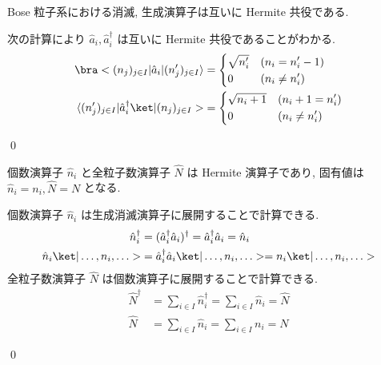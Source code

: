 \documentclass[uplatex,dvipdfmx,a4paper,11pt]{jlreq}
\makeatletter
\numberwithin{equation}{section}
\theoremstyle{definition}
\renewenvironment{proof}[1][\proofname]{\par
  \normalfont
  \topsep6\p@\@plus6\p@ \trivlist
  \item[\hskip\labelsep{\bfseries #1}\@addpunct{\bfseries}]\ignorespaces\quad\par
}{
  \qed\endtrivlist\@endpefalse
}
\renewcommand\proofname{証明}
\makeatother
\begin{document}
\begin{proposition}[Q21-38(i)(ii)]
  Bose 粒子系における消滅, 生成演算子は互いに Hermite 共役である.
\end{proposition}
\begin{proof}
  次の計算により $\hat{a}_i, \hat{a}_i^\dagger$ は互いに Hermite 共役であることがわかる.
  \begin{align}
    \bra<(n_j)_{j\in I}|\hat{a}_i|(n_j')_{j\in I}\rangle         & = \begin{dcases}
                                                                       \sqrt{n_i'} & (n_i = n_i' - 1) \\
                                                                       0           & (n_i \neq n_i')
                                                                     \end{dcases}    \\
    \langle(n_j')_{j\in I}|\hat{a}_i^\dagger\ket|(n_j)_{j\in I}> & = \begin{dcases}
                                                                       \sqrt{n_i + 1} & (n_i + 1 = n_i') \\
                                                                       0              & (n_i \neq n_i')
                                                                     \end{dcases}
  \end{align}
\end{proof}

\begin{proposition}[Q21-39(i)(ii)(iii)(iv)]
  個数演算子 $\hat{n}_i$ と全粒子数演算子 $\hat{N}$ は Hermite 演算子であり, 固有値は $\hat{n}_i = n_i, \hat{N} = N$ となる.
\end{proposition}
\begin{proof}
  個数演算子 $\hat{n}_i$ は生成消滅演算子に展開することで計算できる.
  \begin{align}
    \hat{n}_i^\dagger                & = (\hat{a}_i^\dagger\hat{a}_i)^\dagger = \hat{a}_i^\dagger\hat{a}_i = \hat{n}_i  \\
    \hat{n}_i\ket|\ldots,n_i,\ldots> & = \hat{a}_i^\dagger\hat{a}_i\ket|\ldots,n_i,\ldots> = n_i\ket|\ldots,n_i,\ldots>
  \end{align}
  全粒子数演算子 $\hat{N}$ は個数演算子に展開することで計算できる.
  \begin{align}
    \hat{N}^\dagger & = \sum_{i\in I}\hat{n}_i^\dagger = \sum_{i\in I}\hat{n}_i = \hat{N} \\
    \hat{N}         & = \sum_{i\in I}\hat{n}_i = \sum_{i\in I}n_i = N
  \end{align}
\end{proof}
\end{document}
